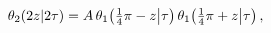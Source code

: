 \[\mathop{\theta_{2}\/}\nolimits\!\left(2z\middle|2\tau\right)=A\mathop{\theta_{%
1}\/}\nolimits\!\left(\tfrac{1}{4}\pi-z\middle|\tau\right)\mathop{\theta_{1}\/%
}\nolimits\!\left(\tfrac{1}{4}\pi+z\middle|\tau\right),\]